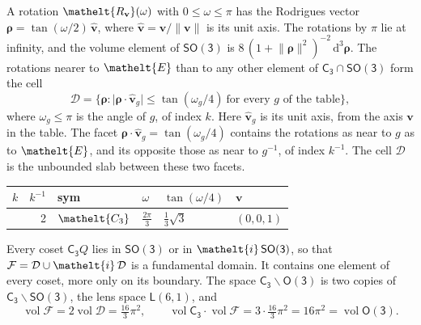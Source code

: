 \documentclass[10pt,a4paper]{article}
\numberwithin{equation}{section}
\newcommand{\eltfont}[1]{{\let\sigma\eltsigma\mathelt{#1}}}
\newcommand{\grp}[1]{\mathsf{#1}}
\newcommand{\cls}[1]{\eltfont{#1}}
\newcommand{\elt}[1]{\eltfont{#1}}
\newcommand{\dirvec}[3]{(#1, #2, #3)}
\newcommand{\unitaxis}{\hat{\mathbf{v}}}
\newcommand{\vv}{\mathbf{v}}
\newcommand{\diff}{\mathrm{d}}
\newcommand{\vol}{\operatorname{vol}}
\newcommand{\rodrigues}{\boldsymbol{\rho}}
\newcommand{\fcell}{\mathcal{D}}
\newcommand{\fdomain}{\mathcal{F}}
\newcommand{\lensspace}[2]{\mathsf{L}(#1, #2)}
\begin{document}
\leavevmode\label{n:vector.rodrigues}\label{n:vector.unitaxis}A rotation $\elt{R_{\vv}}(\omega)$ with $0 \le \omega \le \pi$ has the Rodrigues vector $\rodrigues = \tan(\omega/2)\,\unitaxis$, where $\unitaxis = \vv/\lVert\vv\rVert$ is its unit axis. The rotations by $\pi$ lie at infinity, and the volume element of \href{SO3.pdf}{$\grp{SO(3)}$} is $8\,(1 + \lVert\rodrigues\rVert^2)^{-2}\,\diff^3\rodrigues$.
\leavevmode\label{n:set.cell}The rotations nearer to $\elt{E}$ than to any other element of $\grp{C_{3}} \cap \grp{SO(3)}$ form the cell
\begin{equation}\label{e:cell}\fcell = \bigl\{\rodrigues : \lvert\rodrigues\cdot\unitaxis_g\rvert \le \tan(\omega_g/4)\ \text{for every $g$ of the table}\bigr\},\end{equation}
where $\omega_g \le \pi$ is the angle of $g$, of index $k$. Here $\unitaxis_g$ is its unit axis, from the axis $\vv$ in the table. The facet $\rodrigues\cdot\unitaxis_g = \tan(\omega_g/4)$ contains the rotations as near to $g$ as to $\elt{E}$, and its opposite those as near to $g^{-1}$, of index $k^{-1}$. The cell $\fcell$ is the unbounded slab between these two facets.
{\small{\renewcommand{\arraystretch}{1.3}\begin{longtable}{@{}rrllll@{}}\toprule
$k$ & $k^{-1}$ & sym & $\omega$ & $\tan(\omega/4)$ & $\vv$\\\midrule\endhead
\bottomrule\endfoot\endlastfoot
1 & 2 & $\cls{C_{3}}$ & $\tfrac{2\pi}{3}$ & $\tfrac{1}{3}\sqrt{3}$ & $\dirvec{0}{0}{1}$\\
\bottomrule\end{longtable}}}

\leavevmode\label{n:set.fundamental}Every coset $\grp{C_{3}}Q$ lies in \href{SO3.pdf}{$\grp{SO(3)}$} or in $\elt{i}\,\grp{SO(3)}$, so that $\fdomain = \fcell \cup \elt{i}\,\fcell$ is a fundamental domain. It contains one element of every coset, more only on its boundary.
\leavevmode\label{n:set.lens}The space $\grp{C_{3}}\backslash\grp{O(3)}$ is two copies of $\grp{C_{3}}\backslash\grp{SO(3)}$, the lens space $\lensspace{6}{1}$, and
\begin{equation}\label{e:volume}\vol\fdomain = 2\vol\fcell = \tfrac{16}{3}\pi^2,\qquad \vol\grp{C_{3}}\cdot\vol\fdomain = 3\cdot \tfrac{16}{3}\pi^2 = 16\pi^2 = \vol\grp{O(3)}.\end{equation}
\end{document}
